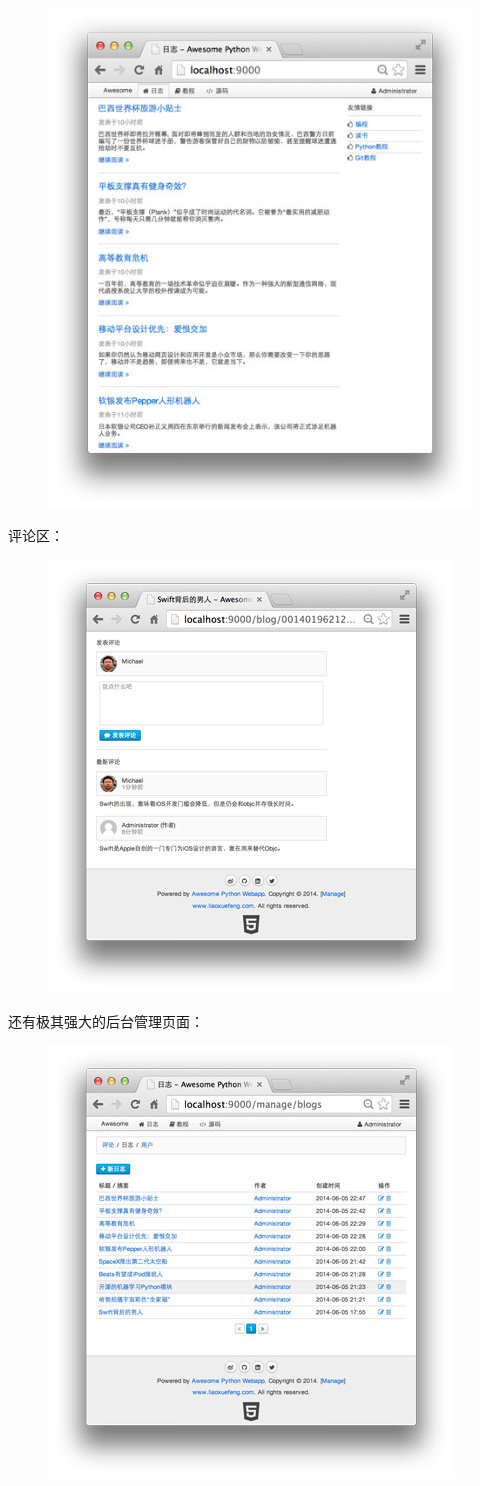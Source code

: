  
 \begin{figure}[htp]
	\centering
	\includegraphics[width=0.6\linewidth]{fig/954926929668576.png}
\end{figure}


评论区：

 
 \begin{figure}[htp]
	\centering
	\includegraphics[width=0.6\linewidth]{fig/954926987474240.png}
\end{figure}


还有极其强大的后台管理页面：

 
 \begin{figure}[htp]
	\centering
	\includegraphics[width=0.6\linewidth]{fig/954927046197152.png}
\end{figure}


